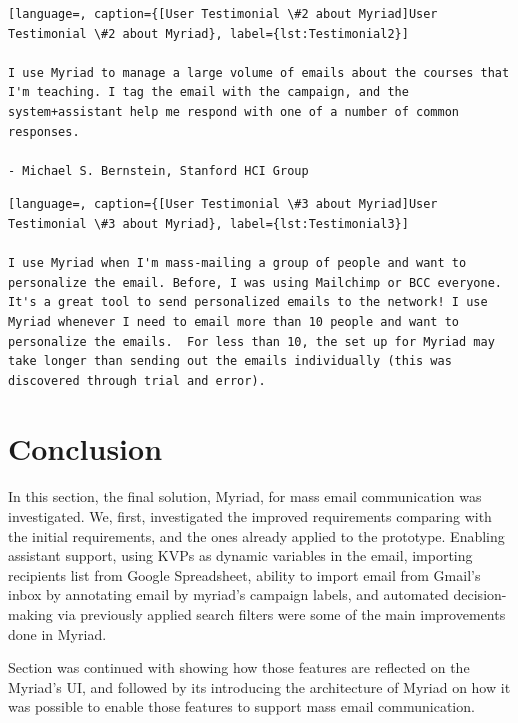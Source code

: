 \begin{lstlisting}[language=, caption={[User Testimonial \#2 about Myriad]User Testimonial \#2 about Myriad}, label={lst:Testimonial2}]

I use Myriad to manage a large volume of emails about the courses that I'm teaching. I tag the email with the campaign, and the system+assistant help me respond with one of a number of common responses.

- Michael S. Bernstein, Stanford HCI Group
\end{lstlisting}

\vspace{1cm}

\begin{lstlisting}[language=, caption={[User Testimonial \#3 about Myriad]User Testimonial \#3 about Myriad}, label={lst:Testimonial3}]

I use Myriad when I'm mass-mailing a group of people and want to personalize the email. Before, I was using Mailchimp or BCC everyone. It's a great tool to send personalized emails to the network! I use Myriad whenever I need to email more than 10 people and want to personalize the emails.  For less than 10, the set up for Myriad may take longer than sending out the emails individually (this was discovered through trial and error).
\end{lstlisting}

\section{Conclusion}
\label{sec:5.5:Conc}

In this section, the final solution, Myriad, for mass email communication was investigated. We, first, investigated the improved requirements comparing with the initial requirements, and the ones already applied to the prototype. Enabling assistant support, using \ac{KVP}s as dynamic variables in the email, importing recipients list from Google Spreadsheet, ability to import email from Gmail's inbox by annotating email by myriad's campaign labels, and automated decision-making via previously applied search filters were some of the main improvements done in Myriad.
\vspace{1cm}

Section was continued with showing how those features are reflected on the Myriad's \ac{UI}, and followed by its introducing the architecture of Myriad on how it was possible to enable those features to support mass email communication.
\vspace{1cm}

